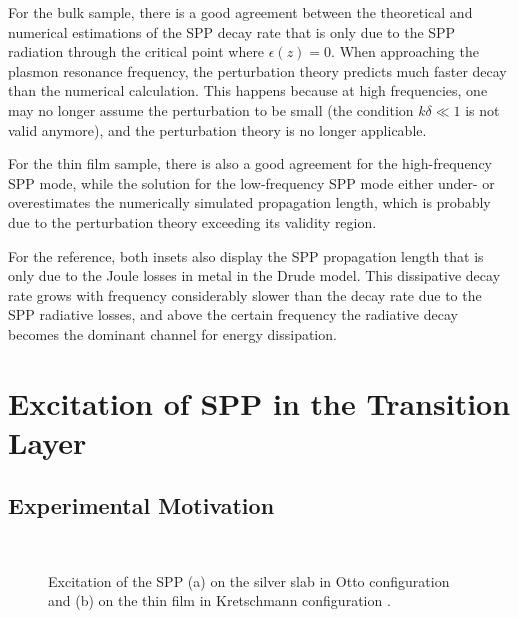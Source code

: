 For the bulk sample, there is a good agreement between the theoretical and numerical estimations of the SPP decay rate that is only due to the SPP radiation through the critical point where $\epsilon(z)=0$.
When approaching the plasmon resonance frequency, the perturbation theory predicts much faster decay than the numerical calculation.
This happens because at high frequencies, one may no longer assume the perturbation to be small (the condition $k\delta \ll 1$ is not valid anymore), and the perturbation theory is no longer applicable.

For the thin film sample, there is also a good agreement for the high-frequency SPP mode, while the solution for the low-frequency SPP mode either under- or overestimates the numerically simulated propagation length, which is probably due to the perturbation theory exceeding its validity region.

For the reference, both insets also display the SPP propagation length that is only due to the Joule losses in metal in the Drude model.
This dissipative decay rate grows with frequency considerably slower than the decay rate due to the SPP radiative losses, and above the certain frequency the radiative decay becomes the dominant channel for energy dissipation.



\section{Excitation of SPP in the Transition Layer}

\subsection{Experimental Motivation}

\begin{figure}[ptb]
\begin{center}
\\[1.0cm]
\caption{Excitation of the SPP (a) on the silver slab in Otto configuration and (b) on the thin film in Kretschmann configuration \cite{raether}.}
\label{fig:ottosetupPlasmon}
\end{center}
\end{figure}


